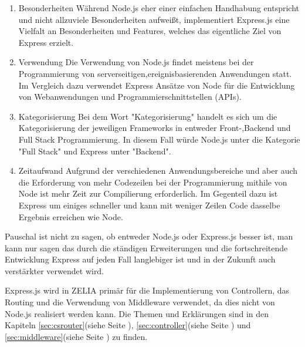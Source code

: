 \begin{enumerate}
    \item Besonderheiten
    \newline
    Während Node.js eher einer einfachen Handhabung entspricht und nicht allzuviele Besonderheiten aufweißt, implementiert Express.js eine Vielfalt an Besonderheiten und Features, welches das eigentliche Ziel von Express erzielt.\cite{NodeExp}
    \item Verwendung
    \newline
    Die Verwendung von Node.js findet meistens bei der Programmierung von serverseitigen,ereignisbasierenden Anwendungen statt. Im Vergleich dazu verwendet Express Ansätze von Node für die Entwicklung von Webanwendungen und Programmierschnittstellen (APIs).\cite{NodeExp}
    \item Kategorisierung
    \newline
    Bei dem Wort "Kategorisierung" handelt es sich um die Kategorisierung der jeweiligen Frameworks in entweder Front-,Backend und Full Stack Programmierung. In diesem Fall würde Node.js unter die Kategorie "Full Stack" und Express unter "Backend".\cite{NodeExp}
    \item Zeitaufwand
    \newline
    Aufgrund der verschiedenen Anwendungsbereiche und aber auch die Erforderung von mehr Codezeilen bei der Programmierung mithile von Node ist mehr Zeit zur Compilierung erforderlich. Im Gegenteil dazu ist Express um einiges schneller und kann mit weniger Zeilen Code dasselbe Ergebnis erreichen wie Node.\cite{NodeExp}
\end{enumerate} 

Pauschal ist nicht zu sagen, ob entweder Node.js oder Express.js besser ist, man kann nur sagen das durch die ständigen Erweiterungen und die fortschreitende Entwicklung Express auf jeden Fall langlebiger ist und in der Zukunft auch verstärkter verwendet wird. \cite{NodeExp}

Express.js wird in ZELIA primär für die Implementierung von Controllern, das Routing und die Verwendung von Middleware verwendet, da dies nicht von Node.js realisiert werden kann. Die Themen und Erklärungen sind in den Kapiteln \ref{sec:csrouter}(siehe Seite \pageref{sec:csrouter}), \ref{sec:controller}(siehe Seite \pageref{sec:controller}) und \ref{sec:middleware}(siehe Seite \pageref{sec:middleware}) zu finden. \cite{NodeExp}